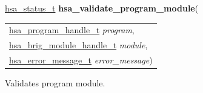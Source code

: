 \documentclass[final]{book}
\newcommand{\hsaarg}[1]{\textit{#1}}
\begin{document}
\begin{appendices}
\noindent\begin{tcolorbox}[breakable,nobeforeafter,colframe=white,colback=lightgray,left=0mm]
\hyperlink{group--status-1gad755322e7ff95456520e8abdbe90d225}{hsa_status_t} \hypertarget{group--HsailLinkerServiceLayer-1ga67e728c68ac9549e89e3464d6d9d534a}{\textbf{hsa_validate_program_module}}(
\vspace{-3.5mm}\begin{longtable}{@{}p{\textwidth}}
\hspace{1.7em}\hyperlink{group--HsailLinkerServiceLayer-1ga7b28ca39da981be49aac99608eb386cb}{hsa_program_handle_t} \hsaarg{program},\\
\hspace{1.7em}\hyperlink{group--FinalizerCoreApi-1gafaea8b9ab368c499b58375f02f4b178b}{hsa_brig_module_handle_t} \hsaarg{module},\\
\hspace{1.7em}\hyperlink{group--FinalizerCoreApi-1ga0105dcb4254850e0ec03d44fc54e11b8}{hsa_error_message_t} \hsaarg{error_message})\end{longtable}

\end{tcolorbox}
Validates program module.


\end{appendices}
\end{document}
